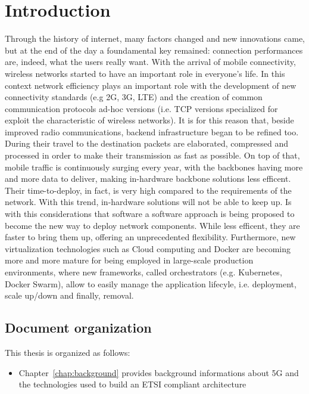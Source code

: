  
\chapter{Introduction}
\label{chap:intro}

 Through the history of internet, many factors changed and new innovations came,
 but at the end of the day a foundamental key remained: connection performances
 are, indeed, what the users really want.
With the arrival of mobile connectivity, wireless networks started to have an 
important role in everyone's life. In this context network efficiency plays 
an important role with the development of new connectivity standards (e.g 2G, 
3G, LTE) and the creation of common communication protocols ad-hoc versions 
(i.e. TCP versions specialized for exploit the characteristic of wireless 
networks). It is for this reason that, beside improved radio communications, 
backend infrastructure began to be refined too. During their travel to the 
destination packets are elaborated, compressed and processed in order to make 
their transmission as fast as possible.
On top of that, mobile traffic is continuously surging every year, with the 
backbones having more and more data to deliver, making in-hardware backbone 
solutions less efficent. Their time-to-deploy, in fact, is very high compared 
to the requirements of the network. With this trend, in-hardware solutions 
will not be able to keep up. Is with this considerations that software a 
software approach is being proposed to become the new way to deploy network 
components. While less efficent, they are faster to bring them up, offering an 
unprecedented flexibility.
 Furthermore, new virtualization technologies such as Cloud computing and Docker
 are becoming more and more mature for being employed in large-scale production
 environments, where new frameworks, called orchestrators (e.g. Kubernetes,
 Docker Swarm), allow to easily manage the application lifecyle, i.e.
 deployment, scale up/down and finally, removal.
 
 \section{Document organization}
 
 This thesis is organized as follows:
 \begin{itemize}
  \item Chapter~\ref{chap:background} provides background informations about 5G 
and the technologies used to build an ETSI compliant architecture
 \end{itemize}
